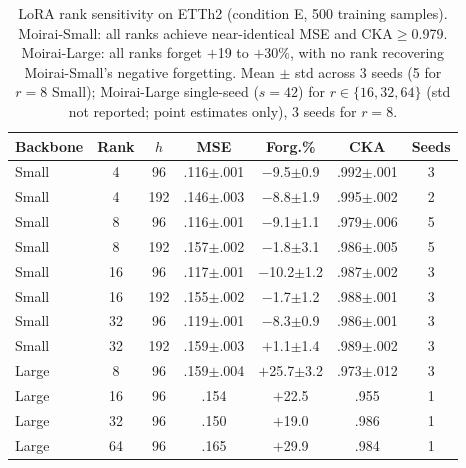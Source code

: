 \begin{table}[ht]
\centering
\caption{LoRA rank sensitivity on ETTh2 (condition E, 500 training samples).
Moirai-Small: all ranks achieve near-identical MSE and CKA$\geq$0.979.
Moirai-Large: all ranks forget $+$19 to $+$30\%, with no rank recovering
Moirai-Small's negative forgetting.
Mean $\pm$ std across 3 seeds (5 for $r{=}8$ Small); Moirai-Large
single-seed ($s{=}42$) for $r \in \{16, 32, 64\}$ (std not reported; point estimates only),
3 seeds for $r{=}8$.}
\label{tab:lora_rank}
\small
\begin{tabular}{lcccccc}
\toprule
Backbone & Rank & $h$ & MSE & Forg.\% & CKA & Seeds \\
\midrule
Small & 4  & 96  & .116{\tiny$\pm$.001} & $-$9.5{\tiny$\pm$0.9}  & .992{\tiny$\pm$.001} & 3 \\
Small & 4  & 192 & .146{\tiny$\pm$.003} & $-$8.8{\tiny$\pm$1.9}  & .995{\tiny$\pm$.002} & 2 \\
Small & 8  & 96  & .116{\tiny$\pm$.001} & $-$9.1{\tiny$\pm$1.1}  & .979{\tiny$\pm$.006} & 5 \\
Small & 8  & 192 & .157{\tiny$\pm$.002} & $-$1.8{\tiny$\pm$3.1}  & .986{\tiny$\pm$.005} & 5 \\
Small & 16 & 96  & .117{\tiny$\pm$.001} & $-$10.2{\tiny$\pm$1.2} & .987{\tiny$\pm$.002} & 3 \\
Small & 16 & 192 & .155{\tiny$\pm$.002} & $-$1.7{\tiny$\pm$1.2}  & .988{\tiny$\pm$.001} & 3 \\
Small & 32 & 96  & .119{\tiny$\pm$.001} & $-$8.3{\tiny$\pm$0.9}  & .986{\tiny$\pm$.001} & 3 \\
Small & 32 & 192 & .159{\tiny$\pm$.003} & $+$1.1{\tiny$\pm$1.4}  & .989{\tiny$\pm$.002} & 3 \\
\midrule
Large & 8  & 96  & .159{\tiny$\pm$.004} & $+$25.7{\tiny$\pm$3.2} & .973{\tiny$\pm$.012} & 3 \\
Large & 16 & 96  & .154                 & $+$22.5                 & .955                 & 1 \\
Large & 32 & 96  & .150                 & $+$19.0                 & .986                 & 1 \\
Large & 64 & 96  & .165                 & $+$29.9                 & .984                 & 1 \\
\bottomrule
\end{tabular}
\end{table}

